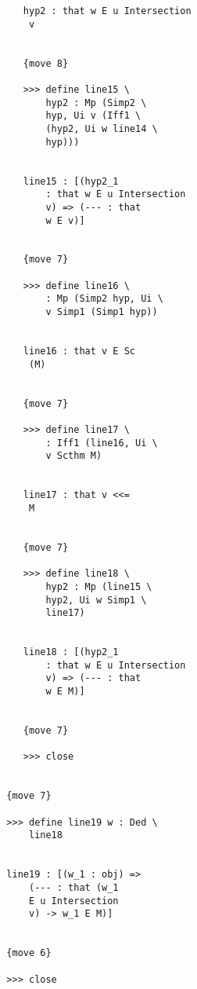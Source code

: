 \documentclass[12pt]{article}
\begin{document}
\begin{verbatim}
                        hyp2 : that w E u Intersection 
                         v


                        {move 8}

                        >>> define line15 \
                            hyp2 : Mp (Simp2 \
                            hyp, Ui v (Iff1 \
                            (hyp2, Ui w line14 \
                            hyp)))


                        line15 : [(hyp2_1 
                            : that w E u Intersection 
                            v) => (--- : that 
                            w E v)]


                        {move 7}

                        >>> define line16 \
                            : Mp (Simp2 hyp, Ui \
                            v Simp1 (Simp1 hyp))


                        line16 : that v E Sc 
                         (M)


                        {move 7}

                        >>> define line17 \
                            : Iff1 (line16, Ui \
                            v Scthm M)


                        line17 : that v <<= 
                         M


                        {move 7}

                        >>> define line18 \
                            hyp2 : Mp (line15 \
                            hyp2, Ui w Simp1 \
                            line17)


                        line18 : [(hyp2_1 
                            : that w E u Intersection 
                            v) => (--- : that 
                            w E M)]


                        {move 7}

                        >>> close


                     {move 7}

                     >>> define line19 w : Ded \
                         line18


                     line19 : [(w_1 : obj) => 
                         (--- : that (w_1 
                         E u Intersection 
                         v) -> w_1 E M)]


                     {move 6}

                     >>> close



\end{verbatim}
\end{document}
